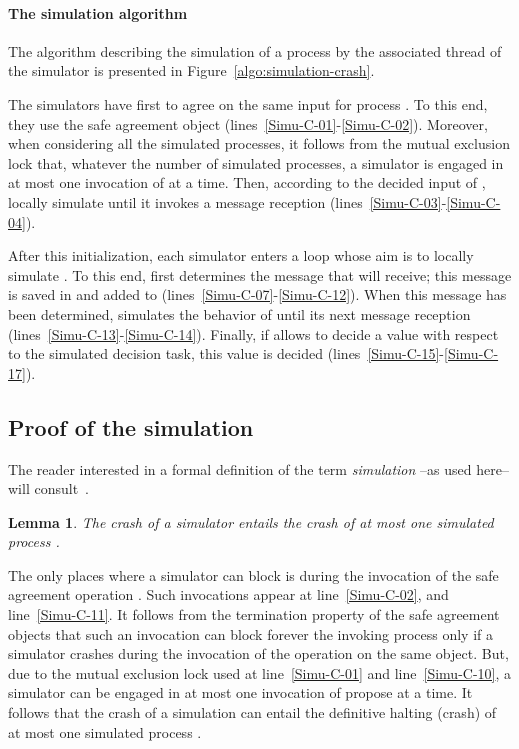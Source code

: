\documentclass[11pt,letterpaper]{article}
\newtheorem{lemma}{Lemma}
\newlength {\afterproof}
\newcommand{\toto}{xxx}
\newenvironment{proofL}{\noindent{\bf Proof }}
{\hspace*{\fill}\par\vspace{\afterproof}}
\begin{document}
\paragraph{The simulation algorithm}
The algorithm describing the simulation of a process 
by the associated thread of the simulator  is presented in
Figure~\ref{algo:simulation-crash}.

The simulators have first to agree on the same input for process .
To this end, they use the safe agreement object 
(lines~\ref{Simu-C-01}-\ref{Simu-C-02}).  Moreover, when considering all
the simulated processes, it follows from the
mutual exclusion lock that, whatever the number of simulated processes,
a simulator  is engaged in at most one
invocation of  at a time.
Then, according to the decided  input of ,  locally simulate 
until it invokes a message  reception (lines~\ref{Simu-C-03}-\ref{Simu-C-04}).


After this initialization, each simulator  enters a loop whose aim
is to locally  simulate . To this end,  first determines
the message that  will receive; this message is saved in 
and added to  (lines~\ref{Simu-C-07}-\ref{Simu-C-12}).
When this message has been determined,  simulates the behavior of 
until its next message reception  (lines~\ref{Simu-C-13}-\ref{Simu-C-14}).
Finally, if  allows  to decide a value with respect to
the simulated decision task, this value is decided
(lines~\ref{Simu-C-15}-\ref{Simu-C-17}).

\subsection{Proof of the simulation}
The reader interested in a formal definition of the term {\it simulation}
--as used here-- will consult~\cite{BGLR01}.

\begin{lemma}
\label{lemma:at-most-one-crash}
The crash of a simulator  entails the crash of at most one simulated
 process .
\end{lemma}

\begin{proofL}
The only places where a simulator  can block is during the invocation of
the safe agreement operation . Such invocations appear at
line~\ref{Simu-C-02}, and line~\ref{Simu-C-11}. It follows from the
termination property of the safe agreement objects that such an invocation
can block forever the invoking process only if a simulator crashes
during the invocation of  the operation  on the same object.
But, due to the mutual exclusion lock used at line~\ref{Simu-C-01} and
line~\ref{Simu-C-10}, a simulator can be engaged in at most one
invocation of propose at a time. It follows that the crash of a simulation
 can entail the definitive halting (crash) of at most one simulated
process .
\renewcommand{\toto}{lemma:at-most-one-crash}
\end{proofL}
\end{document}
